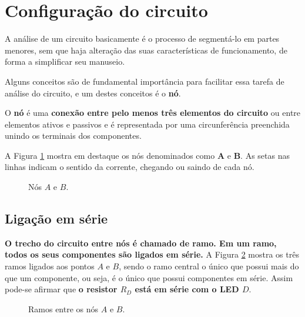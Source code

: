 \section{Configuração do circuito}

A análise de um circuito basicamente é o processo de segmentá-lo em partes menores, sem que haja alteração das suas características de funcionamento, de forma a simplificar seu manuseio.

Alguns conceitos são de fundamental importância para facilitar essa tarefa de análise do circuito, e um destes conceitos é o \textbf{nó}.

O \textbf{nó} é uma \textbf{conexão entre pelo menos três elementos do circuito} ou entre elementos ativos e passivos e é representada por uma circunferência preenchida unindo os terminais dos componentes.

A Figura \ref{fig:CircuitoDesafioNos} mostra em destaque os nós denominados como \textbf{A} e \textbf{B}. As setas nas linhas indicam o sentido da corrente, chegando ou saindo de cada nó.

\begin{figure}[h]
\center
\caption{Nós $A$ e $B$.}
\label{fig:CircuitoDesafioNos}
\qquad
{}
\end{figure}




\subsection{Ligação em série}

\textbf{O trecho do circuito entre nós é chamado de ramo. Em um ramo, todos os seus componentes são ligados em série.}
A Figura \ref{fig:CircuitoDesafioRamos} mostra os três ramos ligados aos pontos $A$ e $B$, sendo o ramo central o único que possui mais do que um componente, ou seja, é o único que possui componentes em série. Assim pode-se afirmar que \textbf{ o resistor $R_D$ está em série com o LED $D$}.

\begin{figure}[h]
\center
\caption{Ramos entre os nós $A$ e $B$.}
\label{fig:CircuitoDesafioRamos}
\qquad
{}
\qquad
{}
\end{figure}


